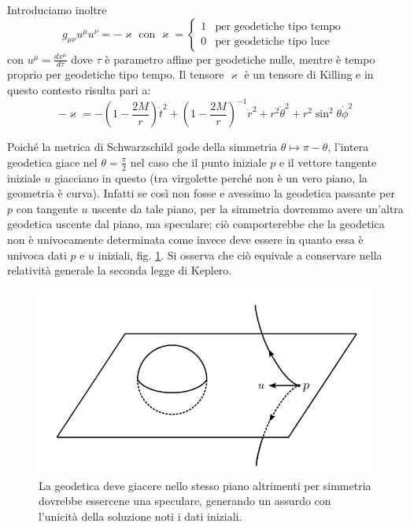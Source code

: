 Introduciamo inoltre
\begin{equation*}
    g_{\mu\nu} u^\mu u^\nu = - \varkappa \textrm{ con } \varkappa =
    \left\{\begin{array}{ll}
    1 & \textrm{per geodetiche tipo tempo }\\
    0 & \textrm{per geodetiche tipo luce}
    \end{array}\right.
\end{equation*}
con $u^\mu=\frac{dx^\mu}{d\tau}$ dove $\tau$ è parametro affine per geodetiche nulle, mentre è tempo proprio per geodetiche tipo tempo.
Il tensore $\varkappa$ è un tensore di Killing e in questo contesto risulta pari a:
\begin{equation*}
    - \varkappa = - \left( 1- \frac{2M}{r}\right) \Dot{t}^2 + \left( 1- \frac{2M}{r}\right)^{-1}\Dot{r}^2 + r^2\Dot{\theta}^2 + r^2\sin^2\theta \Dot{\phi}^2
\end{equation*}

Poiché la metrica di Schwarzschild gode della simmetria $\theta \mapsto \pi - \theta$, l'intera geodetica giace nel  $\theta = \frac{\pi}{2}$ nel caso che il punto iniziale $p$ e il vettore tangente iniziale $u$ giacciano in questo  (tra virgolette perché non è un vero piano, la geometria è curva). Infatti se così non fosse e avessimo la geodetica passante per $p$ con tangente $u$ uscente da tale piano, per la simmetria dovremmo avere un'altra geodetica uscente dal piano, ma speculare; ciò comporterebbe che la geodetica non è univocamente determinata come invece deve essere in quanto essa è univoca dati $p$ e $u$ iniziali, fig. \ref{fig.perassurdo}. Si osserva che ciò equivale a conservare nella relatività generale la seconda legge di Keplero.
\begin{figure}
    \centering
    \includegraphics[scale=0.5]{immagini/perassurdo.png}
    \caption{La geodetica deve giacere nello stesso piano altrimenti per simmetria dovrebbe essercene una speculare, generando un assurdo con l'unicità della soluzione noti i dati iniziali.}
    \label{fig.perassurdo}
\end{figure}

